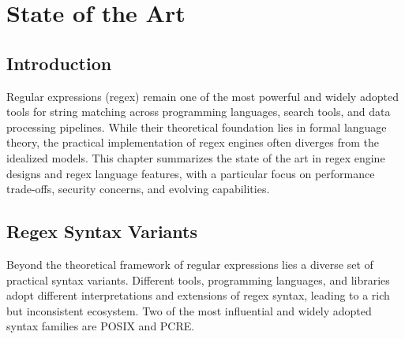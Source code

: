 \chapter{State of the Art}\label{chap:art}

\section{Introduction}
Regular expressions (regex) remain one of the most powerful and widely adopted tools for string matching across programming languages, search tools, and data processing pipelines. While their theoretical foundation lies in formal language theory, the practical implementation of regex engines often diverges from the idealized models. This chapter summarizes the state of the art in regex engine designs and regex language features, with a particular focus on performance trade-offs, security concerns, and evolving capabilities.

\section{Regex Syntax Variants}
\label{sec:regex_syntax}

Beyond the theoretical framework of regular expressions lies a diverse set of practical syntax variants. Different tools, programming languages, and libraries adopt different interpretations and extensions of regex syntax, leading to a rich but inconsistent ecosystem. Two of the most influential and widely adopted syntax families are POSIX and PCRE.


